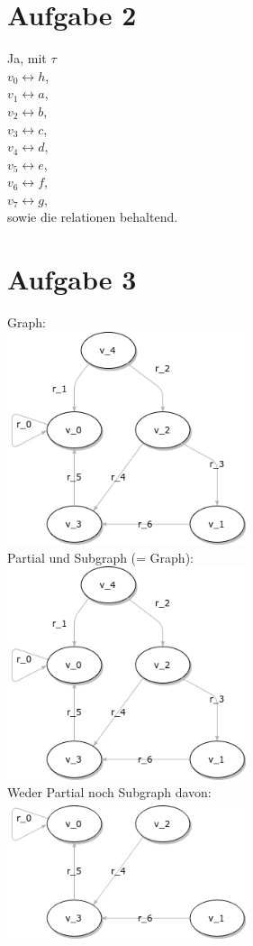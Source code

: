 \documentclass{scrartcl}
\begin{document}
\section*{Aufgabe 2}
Ja, mit $\tau$ \\
$v_0 \leftrightarrow h$, \\
$v_1 \leftrightarrow a$, \\
$v_2 \leftrightarrow b$, \\
$v_3 \leftrightarrow c$, \\
$v_4 \leftrightarrow d$, \\
$v_5 \leftrightarrow e$, \\
$v_6 \leftrightarrow f$, \\
$v_7 \leftrightarrow g$, \\
sowie die relationen behaltend.

\section*{Aufgabe 3}
Graph: \\
\includegraphics[width=7cm]{G_graph.png} \\
Partial und Subgraph (= Graph): \\
\includegraphics[width=7cm]{G_graph.png} \\
Weder Partial noch Subgraph davon: \\
\includegraphics[width=7cm]{no_partial_sub_graph.png}
\end{document}
